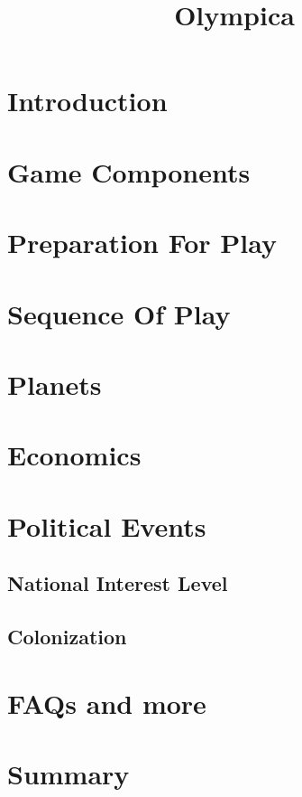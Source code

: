 \documentclass[10pt]{article}
\title{Olympica}
\begin{document}
\maketitle


\tableofcontents


\begin{multicols}{2}

\section{Introduction}
\section{Game Components}
\section{Preparation For Play}
\section{Sequence Of Play}
\section{Planets}
\section{Economics}
\section{Political Events}
\subsection{National Interest Level}
\subsection{Colonization}

\section{FAQs and more}

\section{Summary}

\end{multicols}
\end{document}
